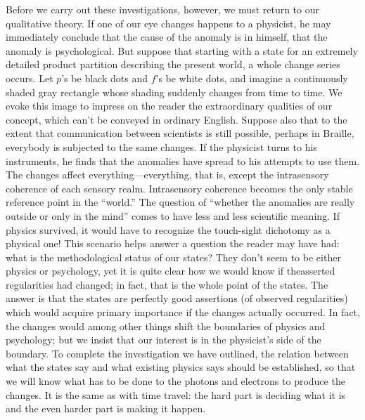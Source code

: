 Before we carry out these investigations, however, we must return to our qualitative theory. If one of our eye changes happens to a physicist, he may immediately conclude that the cause of the anomaly is in himself, that the anomaly is psychological. But suppose that starting with a state for an extremely detailed product partition describing the present world, a whole change series occurs. Let $p$'s be black dots and $f$'s be white dots, and imagine a continuously shaded gray rectangle whose shading suddenly changes from time to time. We evoke this image to impress on the reader the extraordinary qualities of our concept, which can't be conveyed in ordinary English. Suppose also that to the extent that communication between scientists is still possible, perhaps in Braille, everybody is subjected to the same changes. If the physicist turns to his instruments, he finds that the anomalies have spread to his attempts to use them. The changes affect everything---everything, that is, except the intrasensory coherence of each sensory realm. Intrasensory coherence becomes the only stable reference point in the \enquote{world.} The question of \enquote{whether the anomalies are really outside or only in the mind} comes to have less and less scientific meaning. If physics survived, it would have to recognize the touch-sight dichotomy as a physical one! This scenario helps answer a question the reader may have had: what is the methodological status of our states? They don't seem to be either physics or psychology, yet it is quite clear how we would know if theasserted regularities had changed; in fact, that is the whole point of the states. The answer is that the states are perfectly good assertions (of observed regularities) which would acquire primary importance if the changes actually occurred. In fact, the changes would among other things shift the boundaries of physics and psychology; but we insist that our interest is in the physicist's side of the boundary. To complete the investigation we have outlined, the relation between what the states say and what existing physics says should be established, so that we will know what has to be done to the photons and electrons to produce the changes. It is the same as with time travel: the hard part is deciding what it is and the even harder part is making it happen. 

\visbreak

